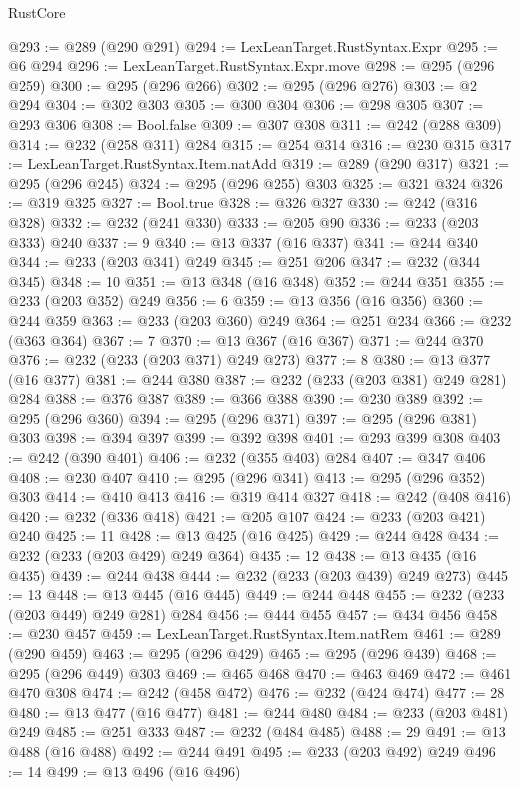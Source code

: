\begin{lexlean}{RustCore}
\begin{coremodule}
@293 := @289 (@290 @291)
@294 := LexLeanTarget.RustSyntax.Expr
@295 := @6 @294
@296 := LexLeanTarget.RustSyntax.Expr.move
@298 := @295 (@296 @259)
@300 := @295 (@296 @266)
@302 := @295 (@296 @276)
@303 := @2 @294
@304 := @302 @303
@305 := @300 @304
@306 := @298 @305
@307 := @293 @306
@308 := Bool.false
@309 := @307 @308
@311 := @242 (@288 @309)
@314 := @232 (@258 @311) @284
@315 := @254 @314
@316 := @230 @315
@317 := LexLeanTarget.RustSyntax.Item.natAdd
@319 := @289 (@290 @317)
@321 := @295 (@296 @245)
@324 := @295 (@296 @255) @303
@325 := @321 @324
@326 := @319 @325
@327 := Bool.true
@328 := @326 @327
@330 := @242 (@316 @328)
@332 := @232 (@241 @330)
@333 := @205 @90
@336 := @233 (@203 @333) @240
@337 := 9
@340 := @13 @337 (@16 @337)
@341 := @244 @340
@344 := @233 (@203 @341) @249
@345 := @251 @206
@347 := @232 (@344 @345)
@348 := 10
@351 := @13 @348 (@16 @348)
@352 := @244 @351
@355 := @233 (@203 @352) @249
@356 := 6
@359 := @13 @356 (@16 @356)
@360 := @244 @359
@363 := @233 (@203 @360) @249
@364 := @251 @234
@366 := @232 (@363 @364)
@367 := 7
@370 := @13 @367 (@16 @367)
@371 := @244 @370
@376 := @232 (@233 (@203 @371) @249 @273)
@377 := 8
@380 := @13 @377 (@16 @377)
@381 := @244 @380
@387 := @232 (@233 (@203 @381) @249 @281) @284
@388 := @376 @387
@389 := @366 @388
@390 := @230 @389
@392 := @295 (@296 @360)
@394 := @295 (@296 @371)
@397 := @295 (@296 @381) @303
@398 := @394 @397
@399 := @392 @398
@401 := @293 @399 @308
@403 := @242 (@390 @401)
@406 := @232 (@355 @403) @284
@407 := @347 @406
@408 := @230 @407
@410 := @295 (@296 @341)
@413 := @295 (@296 @352) @303
@414 := @410 @413
@416 := @319 @414 @327
@418 := @242 (@408 @416)
@420 := @232 (@336 @418)
@421 := @205 @107
@424 := @233 (@203 @421) @240
@425 := 11
@428 := @13 @425 (@16 @425)
@429 := @244 @428
@434 := @232 (@233 (@203 @429) @249 @364)
@435 := 12
@438 := @13 @435 (@16 @435)
@439 := @244 @438
@444 := @232 (@233 (@203 @439) @249 @273)
@445 := 13
@448 := @13 @445 (@16 @445)
@449 := @244 @448
@455 := @232 (@233 (@203 @449) @249 @281) @284
@456 := @444 @455
@457 := @434 @456
@458 := @230 @457
@459 := LexLeanTarget.RustSyntax.Item.natRem
@461 := @289 (@290 @459)
@463 := @295 (@296 @429)
@465 := @295 (@296 @439)
@468 := @295 (@296 @449) @303
@469 := @465 @468
@470 := @463 @469
@472 := @461 @470 @308
@474 := @242 (@458 @472)
@476 := @232 (@424 @474)
@477 := 28
@480 := @13 @477 (@16 @477)
@481 := @244 @480
@484 := @233 (@203 @481) @249
@485 := @251 @333
@487 := @232 (@484 @485)
@488 := 29
@491 := @13 @488 (@16 @488)
@492 := @244 @491
@495 := @233 (@203 @492) @249
@496 := 14
@499 := @13 @496 (@16 @496)

\end{coremodule}
\end{lexlean}
